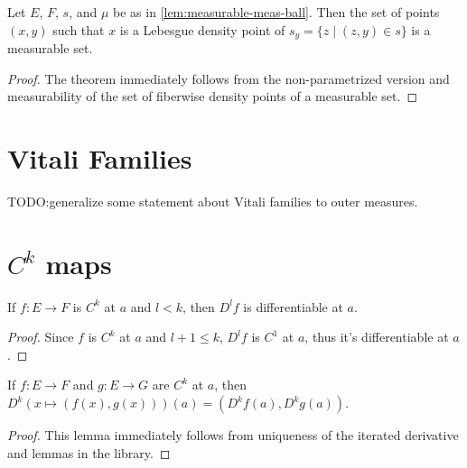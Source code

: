 \begin{corollary}%
  \label{cor:measurable-density}
  \leanok%
  Let \(E\), \(F\), \(s\), and \(\mu\) be as in \autoref{lem:measurable-meas-ball}.
  Then the set of points \((x, y)\) such that \(x\) is a Lebesgue density point of \(s_{y} = \{z \mid (z, y) \in s\}\)
  is a measurable set.
\end{corollary}
\begin{proof}
  \leanok%
  The theorem immediately follows from the non-parametrized version
  and measurability of the set of fiberwise density points of a measurable set.
\end{proof}

\begin{lemma}%
  \label{lem:}
\end{lemma}

\section{Vitali Families}%
\label{sec:vitali-families}

TODO:\@ generalize some statement about Vitali families to outer measures.

\section{\(C^k\) maps}%
\label{sec:ck-maps}

\begin{lemma}%
  \label{lem:Ck-differentiable-iteratedFDeriv}
  \leanok%
  If \(f \colon E \to F\) is \(C^{k}\) at \(a\) and \(l < k\),
  then \(D^{l}f\) is differentiable at \(a\).
\end{lemma}
\begin{proof}
  \leanok%
  Since \(f\) is \(C^{k}\) at \(a\) and \(l + 1 \le k\),
  \(D^{l}f\) is \(C^{1}\) at \(a\),
  thus it's differentiable at \(a\).
\end{proof}

\begin{lemma}%
  \label{lem:iteratedFDeriv-prod}
  If \(f\colon E \to F\) and \(g\colon E \to G\) are \(C^{k}\) at \(a\),
  then \(D^{k}(x \mapsto (f(x), g(x)))(a) = (D^{k}f(a), D^{k}g(a))\).
\end{lemma}
\begin{proof}
  This lemma immediately follows from uniqueness of the iterated derivative
  and lemmas in the library.
\end{proof}

